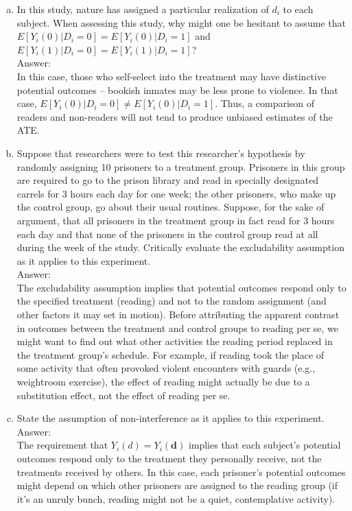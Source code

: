 \documentclass[11pt,notitlepage]{article}		%
\begin{document}
\begin{enumerate}[a)]
\item In this study, nature has assigned a particular realization of $d_i$ to each subject. When assessing this study, why might one be hesitant to assume that $E[Y_i (0)|D_i=0]=E[Y_i (0)|D_i=1]$ and $E[Y_i (1)|D_i=0]= E[Y_i (1)|D_i=1]$? \\
Answer:\\
In this case, those who self-select into the treatment may have distinctive potential outcomes -- bookish inmates may be less prone to violence. In that case, $E[Y_i (0)|D_i=0] \neq E[Y_i (0)|D_i=1]$. Thus, a comparison of readers and non-readers will not tend to produce unbiased estimates of the ATE.
\item Suppose that researchers were to test this researcher's hypothesis by randomly assigning 10 prisoners to a treatment group.  Prisoners in this group are required to go to the prison library and read in specially designated carrels for 3 hours each day for one week; the other prisoners, who make up the control group, go about their usual routines.  Suppose, for the sake of argument, that all prisoners in the treatment group in fact read for 3 hours each day and that none of the prisoners in the control group read at all during the week of the study. Critically evaluate the excludability assumption as it applies to this experiment.  \\
Answer:\\
The excludability assumption implies that potential outcomes respond only to the specified treatment (reading) and not to the random assignment (and other factors it may set in motion).  Before attributing the apparent contrast in outcomes between the treatment and control groups to reading per se, we might want to find out what other activities the reading period replaced in the treatment group's schedule.  For example, if reading took the place of some activity that often provoked violent encounters with guards (e.g., weightroom exercise), the effect of reading might actually be due to a substitution effect, not the effect of reading per se.  
\item State the assumption of non-interference as it applies to this experiment.  \\
Answer:\\
The requirement that $Y_i (d )=Y_i (\textbf{d})$ implies that each subject's potential outcomes respond only to the treatment they personally receive, not the treatments received by others.  In this case, each prisoner's potential outcomes might depend on which other prisoners are assigned to the reading group (if it's an unruly bunch, reading might not be a quiet, contemplative activity). 

\end{enumerate}
\end{document}
